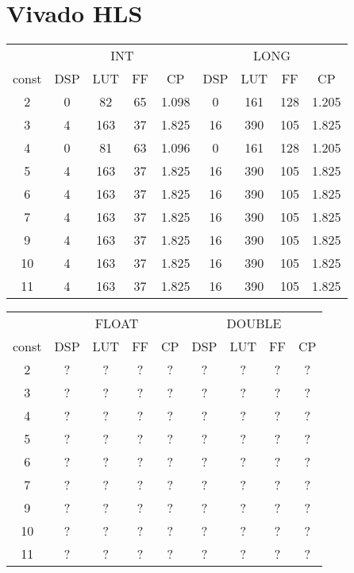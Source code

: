 \documentclass[10pt,a4paper,twoside]{article}
\begin{document}
\section{Vivado HLS}
\begin{tabular}{|c||c|c|c|c|c|c|c|c|}
    \hline
     & \multicolumn{4}{|c}{INT} & \multicolumn{4}{|c||}{LONG}\\
    const & DSP & LUT & FF & CP & DSP & LUT & FF & CP \\
    \hline
    2 & 0 & 82 & 65 & 1.098 & 0 & 161 & 128 & 1.205 \\
    \hline
    3 & 4 & 163 & 37 & 1.825 & 16 & 390 & 105 & 1.825 \\
    \hline
    4 & 0 & 81 & 63 & 1.096 & 0 & 161 & 128 & 1.205 \\
    \hline
    5 & 4 & 163 & 37 & 1.825 & 16 & 390 & 105 & 1.825 \\
    \hline
    6 & 4 & 163 & 37 & 1.825 & 16 & 390 & 105 & 1.825 \\
    \hline
    7 & 4 & 163 & 37 & 1.825 & 16 & 390 & 105 & 1.825 \\
    \hline
    9 & 4 & 163 & 37 & 1.825 & 16 & 390 & 105 & 1.825 \\
    \hline
    10 & 4 & 163 & 37 & 1.825 & 16 & 390 & 105 & 1.825 \\
    \hline
    11 & 4 & 163 & 37 & 1.825 & 16 & 390 & 105 & 1.825\\
    \hline
\end{tabular}

\begin{tabular}{|c||c|c|c|c|c|c|c|c|}
    \hline
     & \multicolumn{4}{|c|}{FLOAT} &  \multicolumn{4}{|c|}{DOUBLE}\\
    const & DSP & LUT & FF & CP & DSP & LUT & FF & CP \\
    \hline
    2 & ? & ? & ? & ? & ? & ? & ? & ? \\
    \hline
    3 & ? & ? & ? & ? & ? & ? & ? & ? \\
    \hline
    4 & ? & ? & ? & ? & ? & ? & ? & ? \\
    \hline
    5 & ? & ? & ? & ? & ? & ? & ? & ? \\
    \hline
    6 & ? & ? & ? & ? & ? & ? & ? & ? \\
    \hline
    7 & ? & ? & ? & ? & ? & ? & ? & ? \\
    \hline
    9 & ? & ? & ? & ? & ? & ? & ? & ? \\
    \hline
    10 & ? & ? & ? & ? & ? & ? & ? & ? \\
    \hline
    11 & ? & ? & ? & ? & ? & ? & ? & ? \\
    \hline
\end{tabular}
\end{document}
